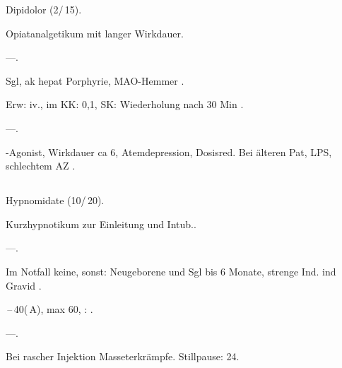 

{
\begin{MedikamentCharakteristika}
  \item[{\TxItemSpezialitaeten}]  Dipidolor{\texttrademark} 
  (2\Ml*/\,15\Mg*).
  \item[Beschreibung] Opiatanalgetikum mit langer Wirkdauer.
  \item[{\TxItemIndikation}] ---.
  \item[{\TxItemKontraindikation}]  Sgl, ak hepat Porphyrie, 
  MAO-Hemmer .
  \item[{\TxItemDosierung}]  Erw: \Ml* iv., 
  \Ml* im\newline
KK: 0,1\MgKg*, SK:
\MgKg\newline Wiederholung nach 30 Min .
  \item[{\TxItemCave}] ---.
  \item[Anm]  {\textmu}-Agonist, Wirkdauer ca 6\Hour*, 
  Atemdepression, Dosisred.
  Bei älteren Pat, LPS, schlechtem AZ .
\end{MedikamentCharakteristika}}
{}


\subsection{}


{}
{}

\begin{MedikamentCharakteristika}
  \item[{\TxItemSpezialitaeten}]  Hypnomidate{\texttrademark} 
  (10\Ml*/\,20\Mg*).
  \item[Beschreibung] Kurzhypnotikum zur Einleitung und Intub..
  \item[{\TxItemIndikation}] ---.
  \item[{\TxItemKontraindikation}]  Im Notfall keine, sonst: 
  Neugeborene und Sgl bis 6 Monate, strenge
Ind. ind Gravid .
  \item[{\TxItemDosierung}]  \,--\,40\Mg* 
  (\,A), max 60\Mg, :
  \MgKg* .
  \item[{\TxItemCave}] ---.
  \item[Anm]  Bei rascher Injektion Masseterkrämpfe. Stillpause: 
  24\Hour* .
\end{MedikamentCharakteristika}



